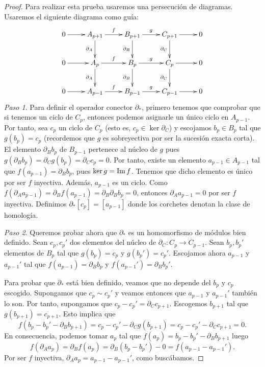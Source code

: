 \begin{proof}
	Para realizar esta prueba usaremos una persecución de diagramas. Usaremos el
	siguiente diagrama como guía:
	\[
	\xymatrix{ 0 \ar@{->}[r] & A_{p+1} \ar@{->}[r]^{f} \ar@{->}[d]_{\partial_A} & B_{p+1} \ar@{->}[r]^{g} \ar@{->}[d]_{\partial_B} & C_{p+1} \ar@{->}[r] \ar@{->}[d]_{\partial_C} & 0 \\ 0 \ar@{->}[r] & A_p \ar@{->}[r]^{f} \ar@{->}[d]_{\partial_A} & B_p \ar@{->}[r]^{g} \ar@{->}[d]_{\partial_B} & C_p \ar@{->}[r] \ar@{->}[d]_{\partial_C} & 0 \\ 0 \ar@{->}[r] & A_{p-1} \ar@{->}[r]^{f} & B_{p-1} \ar@{->}[r]^{g} & C_{p-1} \ar@{->}[r] & 0 }
	\]
	\textit{Paso 1}. Para definir el operador conector $\partial_{*}$, primero
	tenemos que comprobar que si tenemos un ciclo de $C_{p}$, entonces podemos asignarle
	un único ciclo en $A_{p-1}$. Por tanto, sea $c_{p}$ un ciclo de $C_{p}$ (esto
	es, $c_{p}\in \ker \partial_{C}$) y escojamos $b_{p}\in B_{p}$ tal que
	$g(b_{p}) = c_{p}$ (recordemos que $g$ es sobreyectiva por ser la sucesión exacta
	corta). El elemento $\partial_{B}b_{p}$ de $B_{p-1}$ pertenece al núcleo de $g$
	pues $g(\partial_{B}b_{p})=\partial_{C}g(b_{p})=\partial_{C}c_{p}=0$. Por
	tanto, existe un elemento $a_{p-1}\in A_{p-1}$ tal que $f(a_{p-1})=\partial_{B}
	b_{p}$, pues $\ker g = \operatorname{Im} f$. Tenemos que dicho elemento es único por ser $f$
	inyectiva. Además, $a_{p-1}$ es un ciclo. Como
	$f(\partial_{A}a_{p-1}) = \partial_{B}f(a_{p-1}) = \partial_{B}\partial_{B}b_{p}
	= 0$, entonces $\partial_{A}a_{p-1}= 0$ por ser $f$ inyectiva. Definimos
	$\partial_{*}[c_{p}] = [a_{p-1}]$ donde los corchetes denotan la clase de
	homología.
	
	\textit{Paso 2}. Queremos probar ahora que $\partial_{*}$ es un homomorfismo
	de módulos bien definido. Sean $c_{p}, c_{p}'$ dos elementos del núcleo de $\partial
	_{C}: C_{p}\to C_{p-1}$. Sean $b_{p}, b_{p}'$ elementos de $B_{p}$ tal que
	$g(b_{p}) = c_{p}$ y $g(b_{p}')=c_{p}'$. Escojamos ahora $a_{p-1}$ y $a_{p-1}'$
	tal que $f(a_{p-1}) = \partial_{B}b_{p}$ y $f(a_{p-1}') = \partial_{B}b_{p}'$.
	
	Para probar que $\partial_{*}$ está bien definido, veamos que no depende del
	$b_{p}$ y $c_{p}$ escogido. Supongamos que $c_{p}\sim c_{p}'$ y veamos entonces
	que $a_{p-1}$ y $a_{p-1}'$ también lo son. Por tanto, supongamos que $c_{p}- c_{p}
	' = \partial_{C}c_{p+1}$. Escogemos $b_{p+1}$ tal que $g(b_{p+1}) = c_{p+1}$. Esto
	implica que
	\[
	f(b_{p}- b_{p}' - \partial_{B}b_{p+1}) = c_{p}- c_{p}' - \partial_{C}g(b_{p+1}
	) = c_{p}- c_{p}' - \partial_{C}c_{p+1}= 0.
	\]
	En consecuencia, podemos tomar $a_{p}$ tal que
	$f(a_{p}) = b_{p}- b_{p}' - \partial_{B}b_{p+1}$ luego
	\[
	f(\partial_{A}a_{p}) = \partial_{B}f(a_{p}) = \partial_{B}(b_{p}- b_{p}') - 0
	= f(a_{p-1}- a_{p-1}').
	\]
	Por ser $f$ inyectiva, $\partial_{A}a_{p}= a_{p-1}- a_{p-1}'$, como buscábamos.
	

\end{proof}
